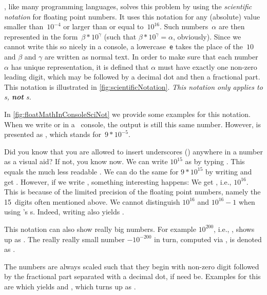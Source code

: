 \python, like many programming languages, solves this problem by using the \emph{scientific notation} for floating point numbers.
It uses this notation for any (absolute)  value smaller than~$10^{-4}$ or larger than or equal to~$10^{16}$.
Such numbers~$\alpha$ are then represented in the form~$\beta*10^{\gamma}$ (such that $\beta*10^{\gamma}=\alpha$, obviously).
Since we cannot write this so nicely in a console, a lowercase~\texttt{e} takes the place of the~$10$ and $\beta$ and $\gamma$ are written as normal text.
In order to make sure that each number~$\alpha$ has unique representation, it is defined that $\alpha$ must have exactly one non-zero leading digit, which may be followed by a decimal dot and then a fractional part.
This notation is illustrated in \cref{fig:scientificNotation}.
\emph{This notation only applies to s, \textbf{not} s.}

In \cref{fig:floatMathInConsoleSciNot} we provide some examples for this notation.
When we write  or  in a \python\ console, the output is still this same number.
However,  is presented as , which stands for~$9*10^{-5}$.%
%
\begin{sloppypar}%
Did you know that you are allowed to insert underscores (\pythonil{_}) anywhere in a number as a visual aid?
If not, you know now.
We can write $10^{15}$ as  by typing .
This equals the much less readable .
We can do the same for $9*10^{15}$ by writing  and get .
However, if we write , something interesting happens:
We get , i.e., $10^{16}$.
This is because of the limited precision of the floating point numbers, namely the 15~digits often mentioned above.
We cannot distinguish $10^{16}$ and $10^{16}-1$ when using \python's s.
Indeed, writing  also yields .%
\end{sloppypar}%
%
This notation can also show really big numbers.
For example $10^{200}$, i.e., , shows up as .
The really really small number $-10^{-200}$ in turn, computed via , is denoted as .

The numbers are always scaled such that they begin with non-zero digit followed by the fractional part separated with a decimal dot, if need be.
Examples for this are  which yields  and , which turns up as .

